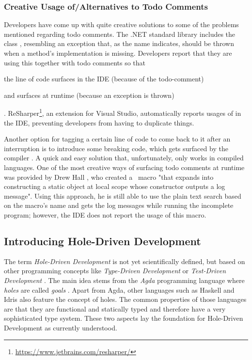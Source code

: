 \subsubsection{Creative Usage of/Alternatives to Todo Comments}
Developers have come up with quite creative solutions to some of the problems mentioned regarding todo comments.
The .NET standard library includes the class \texttt{}, resembling an exception that, as the name indicates, should be thrown when a method's implementation is missing.
Developers report that they are using this together with todo comments \cite{squires_use_2012} so that
\begin{enumerate*}[label=(\roman*)]
\item the line of code surfaces in the IDE (because of the todo-comment)
\item and surfaces at runtime (because an exception is thrown)
\end{enumerate*}.
ReSharper\footnote{\url{https://www.jetbrains.com/resharper/}}, an extension for Visual Studio, automatically reports usages of \texttt{} in the IDE, preventing developers from having to duplicate things.

Another option for tagging a certain line of code to come back to it after an interruption is to introduce some breaking code, which gets surfaced by the compiler \cite{tackabury_how_2019}.
A quick and easy solution that, unfortunately, only works in compiled languages.
One of the most creative ways of surfacing todo comments at runtime was provided by Drew Hall \cite{tackabury_how_2019}, who created a \CC\ macro "that expands into constructing a static object at local scope whose constructor outputs a log message".
Using this approach, he is still able to use the plain text search based on the macro's name and gets the log messages while running the incomplete program; however, the IDE does not report the usage of this macro.



\subsection{Introducing Hole-Driven Development}
\label{sec:introducing-hole-driven-development}
The term \emph{Hole-Driven Development} is not yet scientifically defined, but based on other programming concepts like \emph{Type-Driven Development} \cite{brady_type-driven_2017} or \emph{Test-Driven Development} \cite{mccracken_digital_1957}.
The main idea stems from the \emph{Agda} programming language where \emph{holes} are called \emph{goals} \addref.
Apart from Agda, other languages such as Haskell and Idris also feature the concept of holes.
The common properties of those languages are that they are functional and statically typed and therefore have a very sophisticated type system.
These two aspects lay the foundation for Hole-Driven Development as currently understood.

